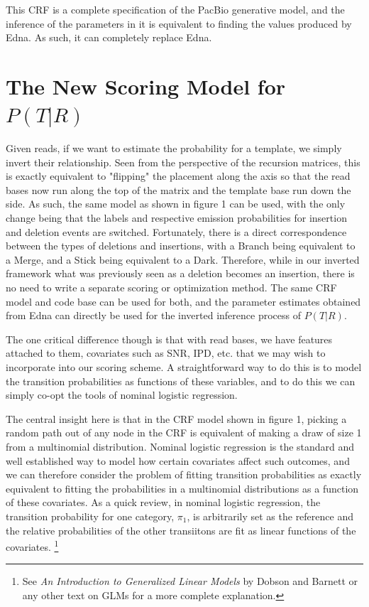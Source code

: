 \documentclass[fleqn,10pt]{SelfArx} %
\begin{document}
This CRF is a complete specification of the PacBio generative model, and the inference of the parameters in it is equivalent to finding the values produced by Edna.  As such, it can completely replace Edna.


\section{The New Scoring Model for $P(T|R)$ }

Given reads, if we want to estimate the probability for a template, we simply invert their relationship.  Seen from the perspective of the recursion matrices, this is exactly equivalent to "flipping" the placement along the axis so that the read bases now run along the top of the matrix and the template base run down the side.  As such, the same model as shown in figure 1 can be used, with the only change being that the labels and respective emission probabilities for insertion and deletion events are switched.  Fortunately, there is a direct correspondence between the types of deletions and insertions, with a Branch being equivalent to a Merge, and a Stick being equivalent to a Dark.  Therefore, while in our inverted framework what was previously seen as a deletion becomes an insertion, there is no need to write a separate scoring or optimization method.  The same CRF model and code base can be used for both, and the parameter estimates obtained from Edna can directly be used for the inverted inference process of $P(T|R)$.

The one critical difference though is that with read bases, we have features attached to them, covariates such as SNR, IPD, etc. that we may wish to incorporate into our scoring scheme.  A straightforward way to do this is to model the transition probabilities as functions of these variables, and to do this we can simply co-opt the tools of nominal logistic regression.

The central insight here is that in the CRF model shown in figure 1, picking a random path out of any node in the CRF is equivalent of making a draw of size 1 from a multinomial distribution.  Nominal logistic regression is the standard and well established way to model how certain covariates affect such outcomes, and we can therefore consider the problem of fitting transition probabilities as exactly equivalent to fitting the probabilities in a multinomial distributions as a function of these covariates.  As a quick review, in nominal logistic regression, the transition probability for one category, $\pi_{1}$, is arbitrarily set as the reference and the relative probabilities of the other transiitons are fit as linear functions of the covariates. \footnote{See \textit{An Introduction to Generalized Linear Models} by Dobson and Barnett or any other text on GLMs for a more complete explanation.}
\end{document}
